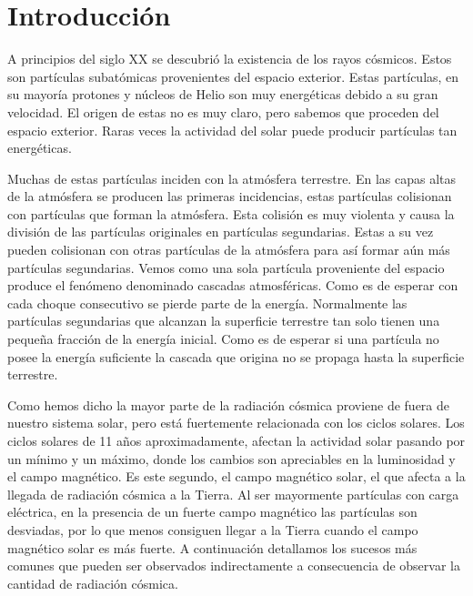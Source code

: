 \chapter{Introducción}
\label{cap1}

A principios del siglo XX se descubrió la existencia de los rayos cósmicos. Estos son partículas subatómicas provenientes del espacio exterior. Estas
partículas, en su mayoría protones y núcleos de Helio  son muy energéticas debido a su gran velocidad. El origen de estas no es muy claro, pero
sabemos que proceden del espacio exterior. Raras veces la actividad del solar puede producir partículas tan energéticas. 
\par
Muchas de estas partículas inciden con la atmósfera terrestre. En las capas altas de la atmósfera se producen las primeras incidencias, estas
partículas colisionan con partículas que forman la atmósfera. Esta colisión es muy violenta y causa la división de las partículas originales en
partículas segundarias. Estas a su vez pueden colisionan con otras partículas de la atmósfera para así formar aún más partículas segundarias. Vemos
como una sola partícula proveniente del espacio produce el fenómeno denominado cascadas atmosféricas. Como es de esperar con cada choque consecutivo
se pierde parte de la energía. Normalmente las partículas segundarias que alcanzan la superficie terrestre tan solo tienen una pequeña fracción de la
energía inicial. Como es de esperar si una partícula no posee la energía suficiente la cascada que origina no se propaga hasta la superficie
terrestre.
\par
Como hemos dicho la mayor parte de la radiación cósmica proviene de fuera de nuestro sistema solar, pero está fuertemente relacionada con los ciclos
solares. Los ciclos solares de 11 años aproximadamente, afectan la actividad solar pasando por un mínimo y un máximo, donde los cambios son
apreciables en la luminosidad y el campo magnético. Es este segundo, el campo magnético solar, el que afecta a la llegada de radiación cósmica a la
Tierra. Al ser mayormente partículas con carga eléctrica, en la presencia de un fuerte campo magnético las partículas son desviadas, por lo que menos
consiguen llegar a la Tierra cuando el campo magnético solar es más fuerte. A continuación detallamos los sucesos más comunes que pueden ser
observados indirectamente a consecuencia de observar la cantidad de radiación cósmica.
